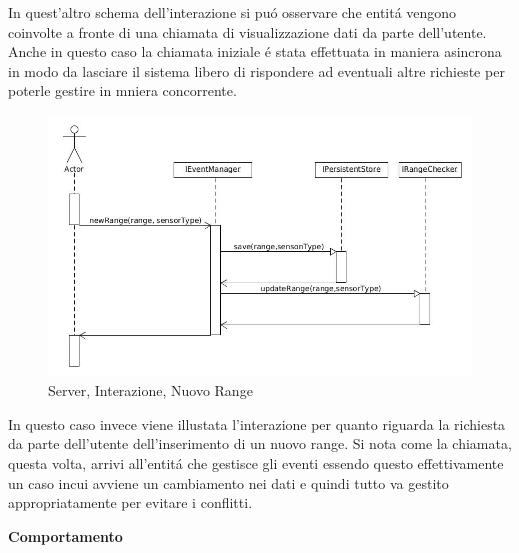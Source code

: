 In quest'altro schema dell'interazione si pu\'o osservare che entit\'a vengono coinvolte a fronte di una chiamata di visualizzazione dati da parte dell'utente. Anche in questo caso la chiamata iniziale \'e stata effettuata in maniera asincrona in modo da lasciare il sistema libero di rispondere ad eventuali altre richieste per poterle gestire in mniera concorrente.

\newpage

\begin{figure}[h]
\centering
\includegraphics[scale=0.4]{Figures/DomainModel/Server/NewRangeInteraction}
\caption{Server, Interazione, Nuovo Range}
\end{figure}

In questo caso invece viene illustata l'interazione per quanto riguarda la richiesta da parte dell'utente dell'inserimento di un nuovo range. Si nota come la chiamata, questa volta, arrivi all'entit\'a che gestisce gli eventi essendo questo effettivamente un caso incui avviene un cambiamento nei dati e quindi tutto va gestito appropriatamente per evitare i conflitti.

\begin{center}
\textbf{Comportamento}
\end{center}

